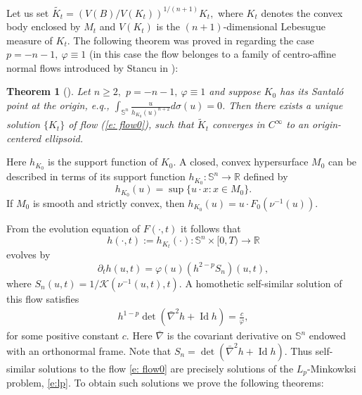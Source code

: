\documentclass{amsart}
\newtheorem*{thmmain}{Theorem}
\theoremstyle{definition}
\theoremstyle{remark}
\numberwithin{equation}{section}
\begin{document}
Let us set
$\tilde{K_t}=(V(B)/V(K_t))^{1/(n+1)}K_t,$ where $K_t$ denotes the convex body enclosed by $M_t$ and $V(K_t)$ is the $(n+1)$-dimensional Lebesugue measure of $K_t.$ The following theorem was proved in \cite{Ivaki 2014-gauss} regarding the case $p=-n-1,~\varphi\equiv1$ (in this case the flow belonges to a family of centro-affine normal flows introduced by Stancu in \cite{Alina 2012}):
\begin{thmmain}[\cite{Ivaki 2014-gauss}]
Let $n\ge2,$ $p=-n-1,~\varphi\equiv1$ and suppose $K_0$ has its Santal\'{o} point at the origin, e.q., $\int_{\mathbb{S}^{n}}\frac{u}{h_{K_0}(u)^{n+2}}d\sigma(u)=0$. Then there exists a unique solution $\{K_t\}$ of flow (\ref{e: flow0}), such that $\tilde{K}_t$ converges in $C^{\infty}$ to an origin-centered ellipsoid.
\end{thmmain}
Here $h_{K_0}$ is the support function of $K_0.$ A closed, convex hypersurface $M_0$ can be described in terms of its support function $h_{K_0}:\mathbb{S}^n\to\mathbb{R}$ defined by
\[h_{K_0}(u)=\sup\{u\cdot x: x\in M_0\}.\]
If $M_0$ is smooth and strictly convex, then $h_{K_0}(u)=u\cdot F_0(\nu^{-1}(u)).$


From the evolution equation of $F(\cdot,t)$ it follows that $$h(\cdot,t):=h_{K_t}(\cdot):\mathbb{S}^{n}\times [0,T)\to \mathbb{R}$$ evolves by
\begin{equation}\label{eq: flow4}
\partial_th(u,t)=\varphi(u)(h^{2-p}S_{n})(u,t),
\end{equation}
where $S_{n}(u,t)=1/\mathcal{K}(\nu^{-1}(u,t),t).$
A homothetic self-similar solution of this flow satisfies
\begin{align} \label{def: self similar}
h^{1-p} \det (\bar{\nabla}^2 h + \operatorname{Id}h)=\frac{c}{\varphi},
\end{align}
for some positive constant $c.$ Here $\bar{\nabla}$ is the covariant derivative on $\mathbb{S}^{n}$ endowed with an orthonormal frame. Note that $S_{n}=\det (\bar{\nabla}^2 h + \operatorname{Id}h).$  Thus self-similar solutions to the flow \eqref{e: flow0} are precisely solutions of the $L_p$-Minkowksi problem, \eqref{e:lp}. To obtain such solutions we prove the following theorems:
\end{document}
